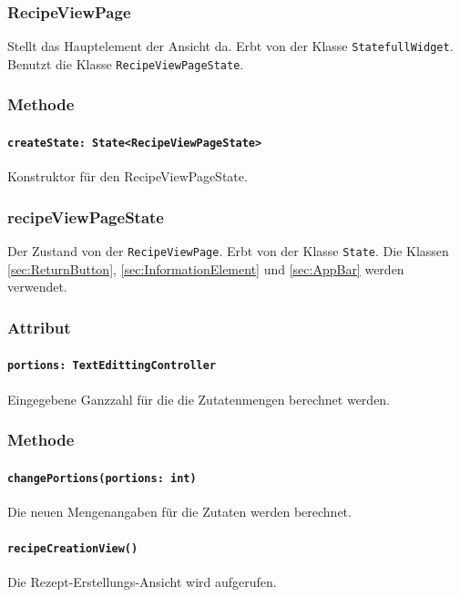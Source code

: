 \documentclass[parskip=full]{scrartcl}
\begin{document}
    \subsubsection{RecipeViewPage}
    Stellt das Hauptelement der Ansicht da. Erbt von der Klasse \texttt{StatefullWidget}. Benutzt die Klasse \texttt{RecipeViewPageState}.
        \subsubsection*{Methode}
            \paragraph*{\texttt{createState: State<RecipeViewPageState>}} Konstruktor für den RecipeViewPageState.
        
    \subsubsection{recipeViewPageState}
    Der Zustand von der \texttt{RecipeViewPage}. Erbt von der Klasse \texttt{State}. Die Klassen \ref{sec:ReturnButton}, \ref{sec:InformationElement} und \ref{sec:AppBar} werden verwendet.
        \subsubsection*{Attribut}
            \paragraph*{\texttt{portions: TextEdittingController}} Eingegebene Ganzzahl für die die Zutatenmengen berechnet werden.
    
        \subsubsection*{Methode}
            \paragraph*{\texttt{changePortions(portions: int)}} Die neuen Mengenangaben für die Zutaten werden berechnet.
            \paragraph*{\texttt{recipeCreationView()}} Die Rezept-Erstellungs-Ansicht wird aufgerufen.
\end{document}
